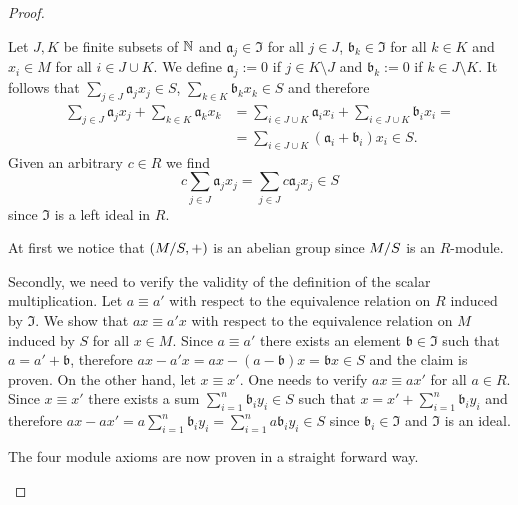 \begin{proof}
\begin{plist}
\item Let $J,K$ be finite subsets of $\N$ and $\mathfrak{a}_j\in \mathfrak{I}$ for all $j\in J$, $\mathfrak{b}_k\in \mathfrak{I}$ for all $k\in K$ and  $x_i\in M$ for all $i\in J\cup K$. We define $\mathfrak{a}_j:=0$ if $j\in K \setminus J$ and $\mathfrak{b}_k:=0$ if $k\in J\setminus K$. It follows that $\sum_{j\in J}\mathfrak{a}_jx_j\in S$, $\sum_{k\in K}\mathfrak{b}_kx_k\in S$ and therefore
\begin{align*}
\sum_{j\in J}\mathfrak{a}_jx_j+\sum_{k\in K}\mathfrak{a}_kx_k &= \sum_{i\in J\cup K} \mathfrak{a}_ix_i+\sum_{i\in J\cup K} \mathfrak{b}_ix_i=\\
    &=\sum_{i\in J\cup K} (\mathfrak{a}_i+\mathfrak{b}_i)x_i\in S.
\end{align*} 
Given an arbitrary $c\in R$ we find
 \[c\sum_{j\in J}\mathfrak{a}_jx_j=\sum_{j\in J}c\mathfrak{a}_jx_j\in S\]
since $\mathfrak{I}$ is a left ideal in $R$.
\item At first we notice that $(\nicefrac{M}{S}, +)$ is an abelian group since $\nicefrac{M}{S}$ is an $R$-module.

Secondly, we need to verify the validity of the definition of the scalar multiplication. Let $a\equiv a'$ with respect to the equivalence relation on $R$ induced by $\mathfrak{I}$. We show that $ax\equiv a'x$ with respect to the equivalence relation on $M$ induced by $S$ for all $x\in M$. Since $a\equiv a'$ there exists an element $\mathfrak{b}\in\mathfrak{I}$ such that $a=a'+\mathfrak{b}$, therefore $ax-a'x=ax-(a-\mathfrak{b})x=\mathfrak{b}x\in S$ and the claim is proven. On the other hand, let $x\equiv x'$. One needs to verify $ax\equiv ax'$ for all $a\in R$. Since $x\equiv x'$ there exists a sum $\sum_{i=1}^n\mathfrak{b}_iy_i\in S$ such that $x=x'+\sum_{i=1}^n\mathfrak{b}_iy_i$ and therefore $ax-ax'=a\sum_{i=1}^n\mathfrak{b}_iy_i=\sum_{i=1}^na\mathfrak{b}_iy_i\in S$ since $\mathfrak{b}_i\in\mathfrak{I}$ and $\mathfrak{I}$ is an ideal.

The four module axioms are now proven in a straight forward way.
\end{plist}
\end{proof}

